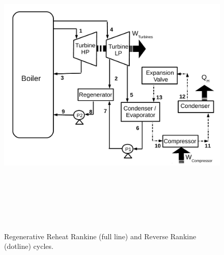 \documentclass[12pts,a4paper,amsmath,amssymb,floatfix]{article}%
\begin{document}
\begin{figure}[h]
\begin{center}
\includegraphics[width=19.0cm,height=15.0cm,angle=-90.]{./Pics/ExtraQuestionPic}
\end{center}
\caption{Regenerative Reheat Rankine (full line) and Reverse Rankine (dotline) cycles.}\label{Ex1}
\end{figure}
\end{document}
